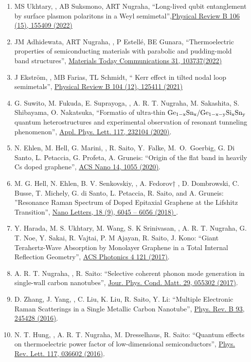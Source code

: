 \begin{enumerate}
 \item MS Ukhtary, \hes, AB Suksmono, ART Nugraha, ``Long-lived qubit entanglement by surface plasmon polaritons in a Weyl semimetal'',\href{https://doi.org/10.1103/PhysRevB.106.155409}{Physical Review B 106 (15), 155409 (2022)}

\item   JM Adhidewata, ART Nugraha, \hes, P Estellé, BE Gunara, ``Thermoelectric properties of semiconducting materials with parabolic and pudding-mold band structures'', \href{https://www.sciencedirect.com/science/article/pii/S2352492822005979}{Materials Today Communications 31, 103737(2022)}
\item J Ekström, \hes, MB Farias, TL Schmidt, `` Kerr effect in tilted nodal loop semimetals'', \href{https://doi.org/10.1103/PhysRevB.104.125411}{Physical Review B 104 (12), 125411 (2021)}

\item G. Suwito, M. Fukuda, E. Suprayoga, \hes, A. R. T. Nugraha, M. Sakashita, S. Shibayama, O. Nakatsuka, ``Formatio of ultra-thin $\rm Ge_{1-x}Sn_x/Ge_{1-x-y}Si_xSn_y$ quantum heterostructures and experimental observation of resonant tunneling phenomenon'', \href{https://doi.org/10.1063/5.0024905}{Appl. Phys. Lett. 117, 232104 (2020)}.
\item N. Ehlen, M. Hell, G. Marini, \hes, R. Saito, Y.~Falke, M.~O.~Goerbig, G. Di Santo, L. Petaccia, G. Profeta, A. Gruneis: ``Origin of the flat band in heavily Cs doped graphene'', \href{https://doi.org/10.1021/acsnano.9b08622}{ACS Nano 14, 1055 (2020)}.
  
  \item M. G. Hell, N. Ehlen, B. V. Senkovskiy, \hes, A. Fedorov† , D. Dombrowski, C. Busse, T. Michely, G. di Santo, L. Petaccia, R. Saito, and A. Gruneis: ''Resonance Raman Spectrum of Doped Epitaxial Graphene at the Lifshitz Transition'', \href{http://dx.doi.org/10.1021/acs.nanolett.8b02979}{Nano Letters, 18 (9), 6045 -- 6056 (2018) }.
\item Y. Harada, M. S. Ukhtary, M. Wang, S. K Srinivasan, \hes, A. R. T. Nugraha, G. T. Noe, Y. Sakai, R. Vajtai, P. M Ajayan, R. Saito, J. Kono: ``Giant Terahertz-Wave Absorption by Monolayer Graphene in a Total Internal Reflection Geometry'', \href{http://dx.doi.org/10.1021/acsphotonics.6b00663} {ACS Photonics  4 121 (2017)}.
\item A. R. T. Nugraha, \hes, R. Saito: ``Selective coherent phonon mode generation in single-wall carbon nanotubes'', \href{
https://dx.doi.org/10.1088/1361-648X/29/5/055302}{Jour. Phys. Cond. Matt. 29, 055302 (2017)}.
\item D. Zhang, J. Yang, \hes, C. Liu, K. Liu, R. Saito, Y. Li:
  ``Multiple Electronic Raman Scatterings in a Single Metallic Carbon
  Nanotube'',
  \href{http://dx.doi.org/10.1103/PhysRevB.93.245428}{Phys. Rev. B 93,
    245428 (2016)}.
\item N. T. Hung, \hes, A. R. T. Nugraha, M.  Dresselhaus, R. Saito:
  ``Quantum effects on thermoelectric power factor of low-dimensional
  semiconductors'', \href{http://dx.doi.org/10.1103/PhysRevLett.117.036602}{Phys. Rev. Lett. 117, 036602 (2016)}.


\end{enumerate}
